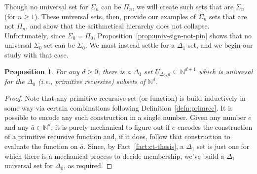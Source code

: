 \documentclass{article}
\theoremstyle{plain}
\newtheorem{prop}[thm]{Proposition}
\theoremstyle{definition}
\newcommand{\tuple}{\bar}
\begin{document}
Though no universal set for $\Sigma_n$ can be $\Pi_n$, we will create
such sets that are $\Sigma_n$ (for $n \geq 1$). These universal sets,
then, provide our examples of $\Sigma_n$ sets that are not $\Pi_n$,
and show that the arithmetical hierarchy does not
collapse. Unfortunately, since $\Sigma_0 = \Pi_0$,
Proposition~\ref{prop:univ-sign-not-pin} shows that no universal
$\Sigma_0$ set can be $\Sigma_0$. We must instead settle for a
$\Delta_1$ set, and we begin our study with that case.

\begin{prop}
  For any $d \geq 0$, there is a $\Delta_1$ set $U_{\Delta_0,d}
  \subseteq \mathbb{N}^{d+1}$ which is universal for the $\Delta_0$
  (i.e., primitive recursive) subsets of $\mathbb{N}^d$.
\end{prop}
\begin{proof}
  Note that any primitive recursive set (or function) is build
  inductively in some way via certain combinations following
  Definition~\ref{defn:primrec}. It is possible to encode any such
  construction in a single number. Given any number $e$ and any
  $\tuple{a} \in \mathbb{N}^d$, it is purely mechanical to figure out
  if $e$ encodes the construction of a primitive recursive function
  and, if it does, follow that construction to evaluate the function
  on $\tuple{a}$. Since, by Fact~\ref{fact:ct-thesis}, a $\Delta_1$
  set is just one for which there is a mechanical process to decide
  membership, we've build a $\Delta_1$ universal set for $\Delta_0$,
  as required.
\end{proof}
\end{document}
